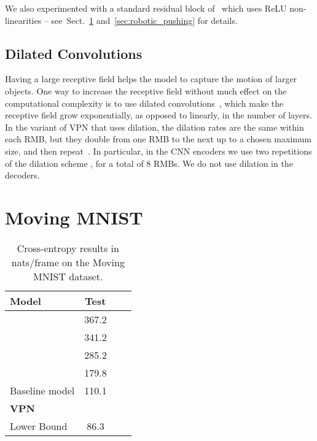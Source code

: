 \documentclass{article}
\newcommand{\sref}[1]{Sect.~\ref{#1}}
\begin{document}
We also experimented with a standard residual block of~\citep{DBLP:journals/corr/HeZR016} which uses ReLU non-linearities -- see~\sref{sec:moving_mnist} and~\ref{sec:robotic_pushing} for details.



\subsection{Dilated Convolutions}
Having a large receptive field helps the model to capture the motion of larger objects. One way to increase the receptive field without much effect on the computational complexity is to use dilated convolutions~\citep{DBLP:journals/corr/ChenPKMY14,DBLP:journals/corr/YuK15}, which make the receptive field grow exponentially, as opposed to linearly, in the number of layers. In the variant of VPN that uses dilation, the dilation rates are the same within each RMB, but they double from one RMB to the next up to a chosen maximum size, and then repeat~\citep{wavenet}. In particular, in the CNN encoders we use two repetitions of the dilation scheme , for a total of 8 RMBs. We do not use dilation in the decoders.

\section{Moving MNIST}
\label{sec:moving_mnist}

\begin{table}[t]
\small
  \begin{center}
  \begin{tabular}{lccc}
    \toprule
    \textbf{Model} &  \textbf{Test}  \\ \midrule
      \citep{DBLP:conf/nips/ShiCWYWW15} & 367.2 \\
      \citep{ICML-2015-SrivastavaMS} & 341.2 \\ 
      \citep{DBLP:journals/corr/BrabandereJTG16} & 285.2 \\ 
      \citep{DBLP:journals/corr/PatrauceanHC15} & 179.8 \\ 
      {Baseline model} & 110.1  \\ 
      \textbf{VPN} &   \\ \midrule
      {Lower Bound} & 86.3  \\
      \bottomrule
  \end{tabular}
  \end{center}
\caption{Cross-entropy results in nats/frame on the Moving MNIST dataset. }
\label{table:mnist}
\end{table}
\end{document}
